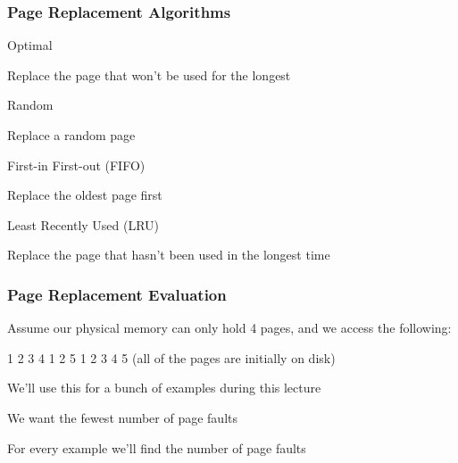   \begin{frame}
    \frametitle{Page Replacement Algorithms}

    Optimal

    \hspace{2em} Replace the page that won't be used for the longest

    \vspace{2em}

    Random

    \hspace{2em} Replace a random page

    \vspace{2em}

    First-in First-out (FIFO)

    \hspace{2em} Replace the oldest page first
    
    \vspace{2em}

    Least Recently Used (LRU)

    \hspace{2em} Replace the page that hasn't been used in the longest time
  \end{frame}

  \begin{frame}
    \frametitle{Page Replacement Evaluation}

    Assume our physical memory can only hold 4 pages, and we access the following:

    \hspace{2em} 1 2 3 4 1 2 5 1 2 3 4 5 (all of the pages are initially on disk)

    \vspace{2em}

    We'll use this for a bunch of examples during this lecture

    \hspace{2em} We want the fewest number of page faults

    \vspace{2em}

    For every example we'll find the number of page faults
  \end{frame}

